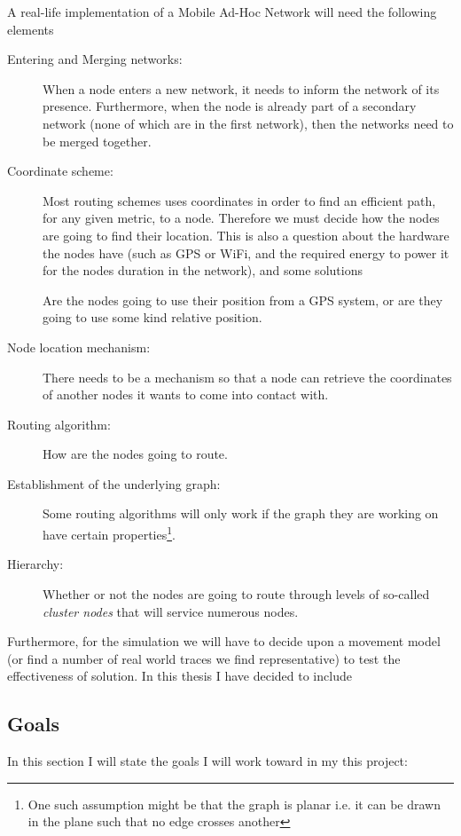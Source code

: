 A real-life implementation of a Mobile Ad-Hoc Network will need the following elements

\begin{description}
\item[Entering and Merging networks:] When a node enters a new network, it needs to inform the network of its presence. Furthermore, when the node is already part of a secondary network (none of which are in the first network), then the networks need to be merged together.  
\item[Coordinate scheme:] Most routing schemes uses coordinates in order to find an efficient path, for any given metric, to a node. Therefore we must decide how the nodes are going to find their location. This is also a question about the hardware the nodes have (such as GPS or WiFi, and the required energy to power it for the nodes duration in the network), and some solutions   

Are the nodes going to use their position from a GPS system, or are they going to use some kind relative position.
\item[Node location mechanism:] There needs to be a mechanism so that a node can retrieve the coordinates of another nodes it wants to come into contact with. 
\item[Routing algorithm:] How are the nodes going to route. 
\item[Establishment of the underlying graph:]  Some routing algorithms will only work if the graph they are working on have certain properties\footnote{One such assumption might be that the graph is planar i.e. it can be drawn in the plane such that no edge crosses another}.
\item[Hierarchy:] Whether or not the nodes are going to route through levels of so-called \emph{cluster nodes} that will service numerous nodes.
\end{description} 

Furthermore, for the simulation we will have to decide upon a movement model (or find a number of real world traces we find representative) to test the effectiveness of solution. In this thesis I have decided to include 

\subsection{Goals}
In this section I will state the goals I will work toward in my this project:

